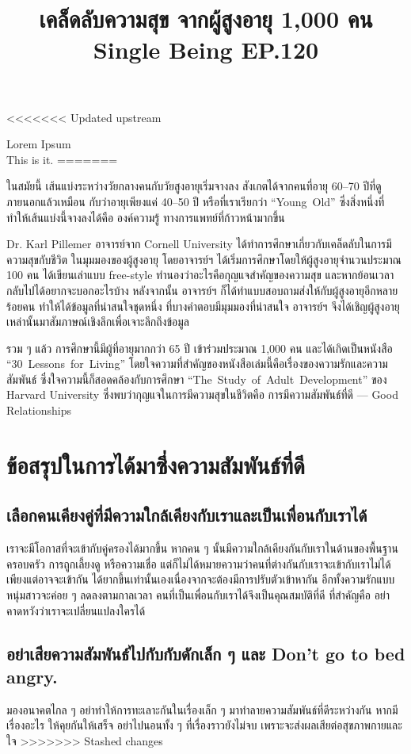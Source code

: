 \documentclass[a4paper]{article}
\title{\flushleft\Huge\textbf{เคล็ดลับความสุข จากผู้สูงอายุ 1,000 คน}\\
\Large Single Being EP.120\\
\vspace{-4ex}}
\date{}
\begin{document}
<<<<<<< Updated upstream
    \maketitle
    Lorem Ipsum \\
    This is it.
=======
\maketitle
\sloppy
\flushleft

ในสมัยนี้ เส้นแบ่งระหว่างวัยกลางคนกับวัยสูงอายุเริ่มจางลง สังเกตได้จากคนที่อายุ 60--70 ปีที่ดูภายนอกแล้วเหมือน
กับว่าอายุเพียงแค่ 40--50 ปี หรือที่เราเรียกว่า \mbox{``Young Old''} ซึ่งสิ่งหนึ่งที่ทำให้เส้นแบ่งนี้จางลงได้คือ องค์ความรู้
ทางการแพทย์ที่ก้าวหน้ามากขึ้น

\rule{0em}{1ex}

Dr. Karl Pillemer อาจารย์จาก Cornell University ได้ทำการศึกษาเกี่ยวกับเคล็ดลับในการมีความสุขกับชีวิต
ในมุมมองของผู้สูงอายุ โดยอาจารย์ฯ ได้เริ่มการศึกษาโดยให้ผู้สูงอายุจำนวนประมาณ 100 คน ได้เขียนเล่าแบบ
free-style ทำนองว่าอะไรคือกุญแจสำคัญของความสุข และหากย้อนเวลากลับไปได้อยากจะบอกอะไรบ้าง
หลังจากนั้น อาจารย์ฯ ก็ได้ทำแบบสอบถามส่งให้กับผู้สูงอายุอีกหลายร้อยคน ทำให้ได้ข้อมูลที่น่าสนใจชุดหนึ่ง
ที่บางคำตอบมีมุมมองที่น่าสนใจ อาจารย์ฯ จึงได้เชิญผู้สูงอายุเหล่านั้นมาสัมภาษณ์เชิงลึกเพื่อเจาะลึกถึงข้อมูล

\rule{0em}{1ex}

รวม ๆ แล้ว การศึกษานี้มีผู้ที่อายุมากกว่า 65 ปี เข้าร่วมประมาณ 1,000 คน และได้เกิดเป็นหนังสือ
\mbox{``30 Lessons for Living''} โดยใจความที่สำคัญของหนังสือเล่มนี้คือเรื่องของความรักและความสัมพันธ์
ซึ่งใจความนี้ก็สอดคล้องกับการศึกษา \mbox{``The Study of Adult Development''} ของ Harvard University
ซึ่งพบว่ากุญแจในการมีความสุขในชีวิตคือ การมีความสัมพันธ์ที่ดี --- Good Relationships

\rule{0em}{1ex}

\section*{ข้อสรุปในการได้มาซึ่งความสัมพันธ์ที่ดี}


\subsection*{เลือกคนเคียงคู่ที่มีความใกล้เคียงกับเราและเป็นเพื่อนกับเราได้}
เราจะมีโอกาสที่จะเข้ากับคู่ครองได้มากขึ้น หากคน ๆ นั้นมีความใกล้เคียงกันกับเราในด้านของพื้นฐานครอบครัว
การถูกเลี้ยงดู หรือความเชื่อ แต่ก็ไม่ได้หมายความว่าคนที่ต่างกันกับเราจะเข้ากับเราไม่ได้ เพียงแต่อาจจะเข้ากัน
ได้ยากขึ้นเท่านั้นเองเนื่องจากจะต้องมีการปรับตัวเข้าหากัน อีกทั้งความรักแบบหนุ่มสาวจะค่อย ๆ ลดลงตามกาลเวลา 
คนที่เป็นเพื่อนกับเราได้จึงเป็นคุณสมบัติที่ดี ที่สำคัญคือ อย่าคาดหวังว่าเราจะเปลี่ยนแปลงใครได้

\subsection*{อย่าเสียความสัมพันธ์ไปกับกับดักเล็ก ๆ และ Don't go to bed angry.}
มองอนาคตไกล ๆ อย่าทำให้การทะเลาะกันในเรื่องเล็ก ๆ มาทำลายความสัมพันธ์ที่ดีระหว่างกัน
หากมีเรื่องอะไร ให้คุยกันให้เสร็จ อย่าไปนอนทั้ง ๆ ที่เรื่องราวยังไม่จบ เพราะจะส่งผลเสียต่อสุขภาพกายและใจ
>>>>>>> Stashed changes
\end{document}
